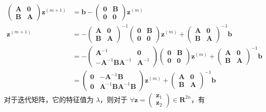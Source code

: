 \documentclass{sjtuarticle}
\begin{document}
\begin{itemize}
\begin{solution}
\begin{itemize}
\begin{align*}
                \begin{pmatrix}\bm{A} & \bm{0}\\ \bm{B} & \bm{A}\end{pmatrix}\bm{z}^{(m+1)}&=\bm{b}-\begin{pmatrix}
                    \bm{0}  & \bm{B} \\ \bm{0} & \bm{0}
                \end{pmatrix}\bm{z}^{(m)} \\
                \bm{z}^{(m+1)}&=-\begin{pmatrix}\bm{A} & \bm{0}\\ \bm{B} & \bm{A}\end{pmatrix}^{-1}\begin{pmatrix}
                    \bm{0}  & \bm{B} \\ \bm{0} & \bm{0}
                \end{pmatrix}\bm{z}^{(m)}+\begin{pmatrix}\bm{A} & \bm{0}\\ \bm{B} & \bm{A}\end{pmatrix}^{-1}\bm{b}\\
                &=-\begin{pmatrix}
                    \bm{A}^{-1} & \bm{0} \\ -\bm{A}^{-1}\bm{B}\bm{A}^{-1} & \bm{A}^{-1}
                \end{pmatrix}\begin{pmatrix}
                    \bm{0}  & \bm{B} \\ \bm{0} & \bm{0}
                \end{pmatrix}\bm{z}^{(m)}+\begin{pmatrix}\bm{A} & \bm{0}\\ \bm{B} & \bm{A}\end{pmatrix}^{-1}\bm{b} \\
                &=\begin{pmatrix}
                    \bm{0} & -\bm{A}^{-1}\bm{B} \\ \bm{0} & \bm{A}^{-1}\bm{B}\bm{A}^{-1}\bm{B}
                \end{pmatrix}\bm{z}^{(m)}+\begin{pmatrix}\bm{A} & \bm{0}\\ \bm{B} & \bm{A}\end{pmatrix}^{-1}\bm{b} 
            \end{align*}
            对于迭代矩阵，它的特征值为 $\lambda$，则对于 $\forall \bm{z}=\begin{pmatrix}\bm{z}_1\\\bm{z}_2\end{pmatrix}\in \mathbf{R}^{2n}$，有

\end{itemize}
\end{solution}
\end{itemize}
\end{document}
